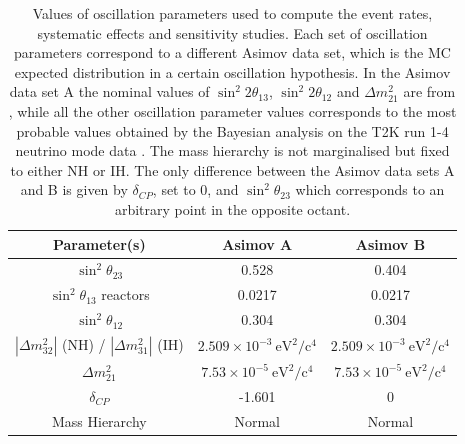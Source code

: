 \begin{table}[H]
\centering
\begin{tabular}{| c | c | c |}
\hline
Parameter(s) &	Asimov A & Asimov B	\\
\hline
$\sin^{2}\theta_{23}$	&	0.528	&  0.404	\\
$\sin^{2} \theta_{13}$ reactors	&	0.0217	&	0.0217	\\
$\sin^{2} \theta_{12}$	&	0.304	&	0.304	\\
$|\Delta m^{2}_{32}|$ (NH) / $|\Delta m^{2}_{31}|$ (IH)	&	$2.509 \times 10^{-3}~\mbox{eV}^2/\mbox{c}^4$	&	$2.509 \times 10^{-3}~\mbox{eV}^2/\mbox{c}^4$	\\
$\Delta m^{2}_{21}$	&	$7.53 \times 10^{-5}~\mbox{eV}^2/\mbox{c}^4$	&	$7.53 \times 10^{-5}~\mbox{eV}^2/\mbox{c}^4$	\\
$\delta_{CP}$	&	-1.601	&	0	\\
Mass Hierarchy	&	Normal	&	Normal	\\  
\hline
\end{tabular}
\caption{
Values of oscillation parameters used to compute the event rates, systematic effects and sensitivity studies. Each set of oscillation parameters correspond to a different 
Asimov data set, which is the MC expected distribution in a certain oscillation hypothesis.
In the Asimov data set A the nominal values of $\sin^2 2 \theta_{13}$, $\sin^2 2 \theta_{12}$
and $\Delta m^2_{21}$  are from \cite{pdg_2014}, while all the other oscillation parameter values corresponds to the most probable values obtained by the Bayesian analysis on the T2K run 1-4 neutrino mode data \cite{T2KLongPaper}. The mass hierarchy is not marginalised but fixed to either NH or IH. The only difference between the Asimov data sets A and B is  given by $\delta_{CP}$, set to 0, and $\sin^{2}\theta_{23}$ which corresponds to an arbitrary point in the opposite octant.
}
\label{tab:osc_params_joint_asimov}
\end{table}